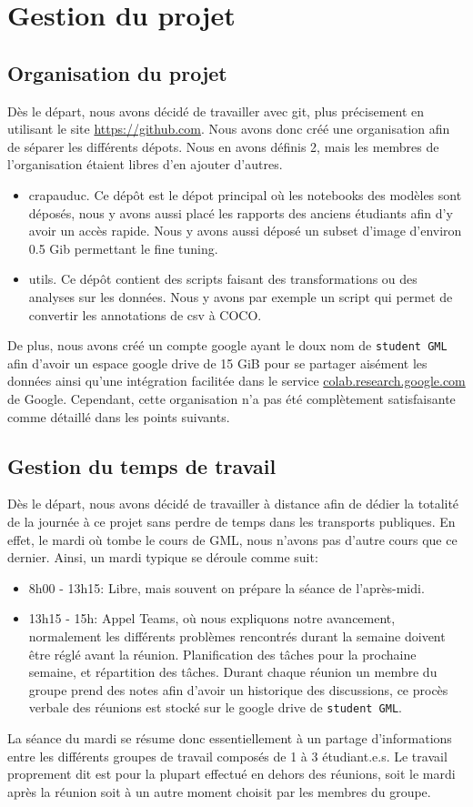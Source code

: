 \chapter{Gestion du projet}
\section{Organisation du projet}
Dès le départ, nous avons décidé de travailler avec git, plus précisement 
en utilisant le site \url{https://github.com}. Nous avons donc créé une organisation afin de séparer les différents dépots. Nous en avons définis 2, mais les membres de l'organisation étaient libres d'en ajouter d'autres.
\begin{itemize}
    \item crapauduc. Ce dépôt est le dépot principal où les notebooks des modèles sont déposés, nous y avons aussi placé les rapports des anciens étudiants afin d'y avoir un accès rapide. Nous y avons aussi déposé un subset d'image d'environ 0.5 Gib permettant le fine tuning.
    \item utils. Ce dépôt contient des scripts faisant des transformations ou des analyses sur les données. Nous y avons par exemple un script qui permet de convertir les annotations de csv à COCO.
\end{itemize}

De plus, nous avons créé un compte google ayant le doux nom de \verb|student GML| afin d'avoir un espace google drive de 15 GiB pour se partager aisément les données ainsi qu'une intégration facilitée dans le service \url{colab.research.google.com} de Google. Cependant, cette organisation n'a pas été complètement satisfaisante comme détaillé dans les points suivants.


\section{Gestion du temps de travail}
Dès le départ, nous avons décidé de travailler à distance afin de dédier 
la totalité de la journée à ce projet sans perdre de temps dans les transports publiques. En effet, le mardi où tombe le cours de GML, nous n'avons pas d'autre cours que ce dernier. Ainsi, un mardi typique se déroule comme suit:
\begin{itemize}
    \item 8h00 - 13h15: Libre, mais souvent on prépare la séance de l'après-midi.
    \item 13h15 - 15h: Appel Teams, où nous expliquons notre avancement, normalement les différents problèmes rencontrés durant la semaine doivent être réglé avant la réunion. Planification des tâches pour la prochaine semaine, et répartition des tâches. Durant chaque réunion un membre du groupe prend des notes afin d'avoir un historique des discussions, ce procès verbale des réunions est stocké sur le google drive de \verb|student GML|.
    \label{item:seance}
\end{itemize}
La séance du mardi se résume donc essentiellement à un partage d'informations entre les différents groupes de travail composés de 1 à 3 étudiant.e.s. Le travail proprement dit est pour la plupart effectué en dehors des réunions, soit le mardi après la réunion soit à un autre moment choisit par les membres du groupe.

